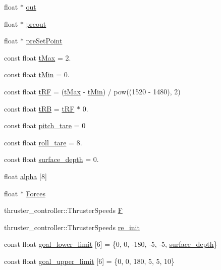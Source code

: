 \begin{DoxyCompactItemize}
float $\ast$ \hyperlink{classControl_a7aae00ff04e44453c56e0b4c500f902c}{out}
\item 
float $\ast$ \hyperlink{classControl_a68319ff62b7b0a0f2034e6daf6a79aa3}{preout}
\item 
float $\ast$ \hyperlink{classControl_a94f3484d88729c31dfd74b983f7fab0d}{pre\+Set\+Point}
\item 
const float \hyperlink{classControl_aa0dfe0af55adef6ba02ba98cd538de6f}{t\+Max} = 2.
\item 
const float \hyperlink{classControl_a7cccef9b9893cbc515c85be334d34108}{t\+Min} = 0.
\item 
const float \hyperlink{classControl_acc43d71e4a89ff753f7d12f7fa562f7f}{t\+RF} = (\hyperlink{classControl_aa0dfe0af55adef6ba02ba98cd538de6f}{t\+Max} -\/ \hyperlink{classControl_a7cccef9b9893cbc515c85be334d34108}{t\+Min}) / pow((1520 -\/ 1480), 2)
\item 
const float \hyperlink{classControl_a5a5a86dff393624defa3747d2e2a39b3}{t\+RB} = \hyperlink{classControl_acc43d71e4a89ff753f7d12f7fa562f7f}{t\+RF} $\ast$ 0.
\item 
const float \hyperlink{classControl_a918db5567eafcc94052d8f41f94f462e}{pitch\+\_\+tare} = 0
\item 
const float \hyperlink{classControl_ae5285f73379bd5cbc060d99983de2c82}{roll\+\_\+tare} = 8.
\item 
const float \hyperlink{classControl_aea3797b8e27792b1d7887b92da69486e}{surface\+\_\+depth} = 0.
\item 
float \hyperlink{classControl_a9d9f9a31c555e320a948d062f7435edf}{alpha} \mbox{[}8\mbox{]}
\item 
float $\ast$ \hyperlink{classControl_a9d6bd0b67c1a539e3427a6bc87c71939}{Forces}
\item 
thruster\+\_\+controller\+::\+Thruster\+Speeds \hyperlink{classControl_a812e1016b531c2efae35d17b03ec34eb}{F}
\item 
thruster\+\_\+controller\+::\+Thruster\+Speeds \hyperlink{classControl_a575ab1b3c33d659078391792285040d9}{re\+\_\+init}
\item 
const float \hyperlink{classControl_ae28212c8997ed67f06e82356f8a5e67a}{goal\+\_\+lower\+\_\+limit} \mbox{[}6\mbox{]} = \{0, 0, -\/180, -\/5, -\/5, \hyperlink{classControl_aea3797b8e27792b1d7887b92da69486e}{surface\+\_\+depth}\}
\item 
const float \hyperlink{classControl_a3ec640ae9e440c49fe6c917597487856}{goal\+\_\+upper\+\_\+limit} \mbox{[}6\mbox{]} = \{0, 0, 180, 5, 5, 10\}
\item 

\end{DoxyCompactItemize}
